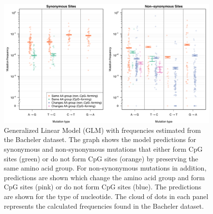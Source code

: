 \documentclass{article}
\begin{document}
\begin{figure}[ht!]
\centering
\includegraphics[scale = .55]{modeled_freqs.pdf}
\caption{Generalized Linear Model (GLM) with frequencies estimated from the Bacheler dataset. The graph shows the model predictions for synonymous and non-synonymous mutations that either form CpG sites (green) or do not form CpG sites (orange) by preserving the same amino acid group. For non-synonymous mutations in addition, predictions are shown which change the amino acid group and form CpG sites (pink) or do not form CpG sites (blue). The predictions are shown for the type of nucleotide. The cloud of dots in each panel represents the calculated frequencies found in the Bacheler dataset.}
\label{modeled_freqs}
\end{figure}
\end{document}
